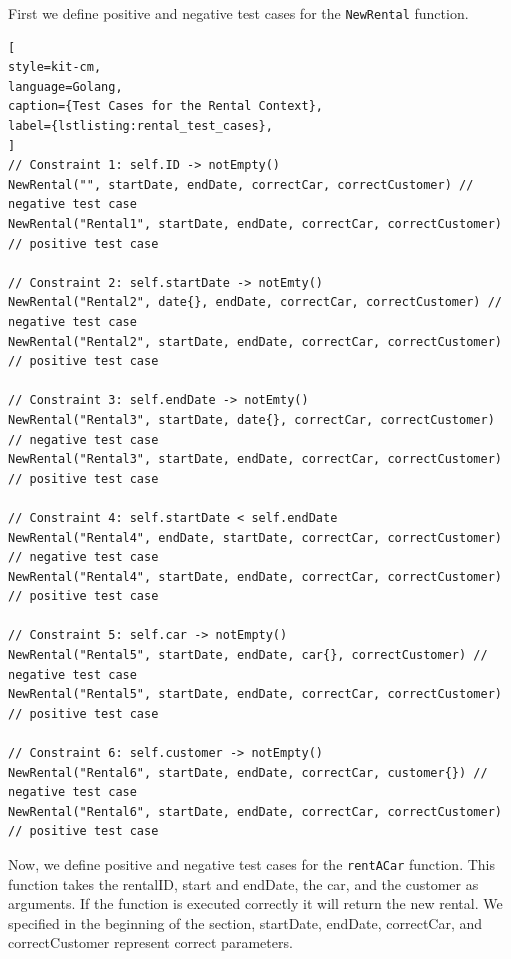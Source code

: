 First we define positive and negative test cases for the \texttt{NewRental} function.
\begin{lstlisting}[
style=kit-cm,
language=Golang,
caption={Test Cases for the Rental Context},
label={lstlisting:rental_test_cases},
]
// Constraint 1: self.ID -> notEmpty()
NewRental("", startDate, endDate, correctCar, correctCustomer) // negative test case
NewRental("Rental1", startDate, endDate, correctCar, correctCustomer) // positive test case

// Constraint 2: self.startDate -> notEmty()
NewRental("Rental2", date{}, endDate, correctCar, correctCustomer) // negative test case
NewRental("Rental2", startDate, endDate, correctCar, correctCustomer) // positive test case

// Constraint 3: self.endDate -> notEmty()
NewRental("Rental3", startDate, date{}, correctCar, correctCustomer) // negative test case
NewRental("Rental3", startDate, endDate, correctCar, correctCustomer) // positive test case

// Constraint 4: self.startDate < self.endDate
NewRental("Rental4", endDate, startDate, correctCar, correctCustomer) // negative test case
NewRental("Rental4", startDate, endDate, correctCar, correctCustomer) // positive test case

// Constraint 5: self.car -> notEmpty()
NewRental("Rental5", startDate, endDate, car{}, correctCustomer) // negative test case
NewRental("Rental5", startDate, endDate, correctCar, correctCustomer) // positive test case

// Constraint 6: self.customer -> notEmpty()
NewRental("Rental6", startDate, endDate, correctCar, customer{}) // negative test case
NewRental("Rental6", startDate, endDate, correctCar, correctCustomer) // positive test case
\end{lstlisting}
  
Now, we define positive and negative test cases for the \texttt{rentACar\(\)} function.
This function takes the rentalID, start and endDate, the car, and the customer as arguments.
If the function is executed correctly it will return the new rental.
We specified in the beginning of the section, startDate, endDate, correctCar, and correctCustomer represent correct parameters.

